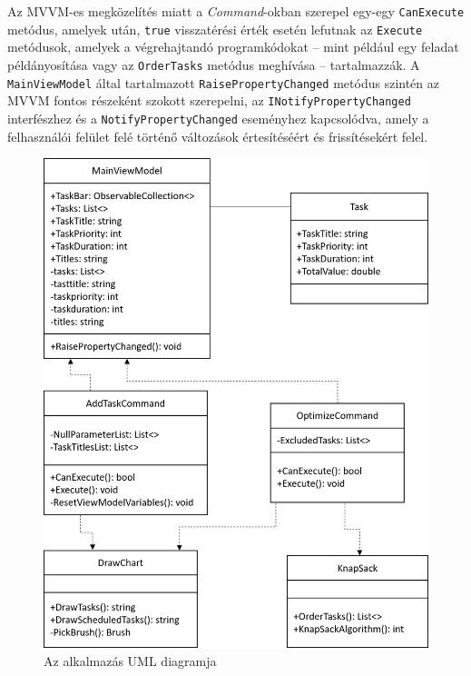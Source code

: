 Az MVVM-es megközelítés miatt a \textit{Command}-okban szerepel egy-egy \texttt{CanExecute} metódus, amelyek után, \texttt{true} visszatérési érték esetén lefutnak az \texttt{Execute} metódusok, amelyek a végrehajtandó programkódokat -- mint például egy feladat példányosítása vagy az \texttt{OrderTasks} metódus meghívása -- tartalmazzák. A  \texttt{MainViewModel} által tartalmazott \texttt{RaisePropertyChanged} metódus szintén az MVVM fontos részeként szokott szerepelni, az \texttt{INotifyPropertyChanged} interfészhez és a \texttt{NotifyPropertyChanged} eseményhez kapcsolódva, amely a felhasználói felület felé történő változások értesítéséért és frissítésekért felel.
\begin{figure}[h]
	\centering
	\includegraphics[scale=0.9]{images/uml.png}
	\caption{Az alkalmazás UML diagramja}
	\label{fig:uml}
\end{figure}
